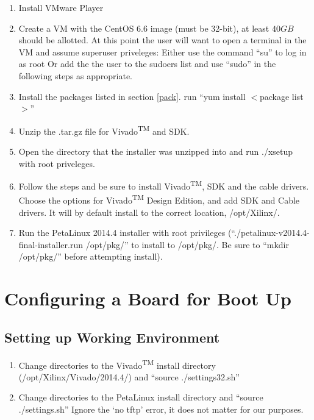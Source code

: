 \begin{enumerate}
\item Install VMware Player
\item Create a VM with the CentOS 6.6 image (must be 32-bit), at least $40GB$ should be allotted.
\subitem At this point the user will want to open a terminal in the VM and assume superuser priveleges:
\subsubitem Either use the command ``su'' to log in as root
\subsubitem Or add the the user to the sudoers list and use ``sudo'' in the following steps as appropriate.
\item Install the packages listed in section \ref{pack}.
\subitem run ``yum install $<$package list$>$''
\item Unzip the .tar.gz file for Vivado\textsuperscript{TM} and SDK.
\item Open the directory that the installer was unzipped into and run ./xsetup with root priveleges.
\item Follow the steps and be sure to install Vivado\textsuperscript{TM}, SDK and the cable drivers. Choose the options for Vivado\textsuperscript{TM} Design Edition, and add SDK and Cable drivers. It will by default install to the correct location, /opt/Xilinx/.
\item\nohyphens{ Run the PetaLinux 2014.4 installer with root privileges (``./petalinux-v2014.4-final-installer.run /opt/pkg/'' to install to /opt/pkg/. Be sure to ``mkdir /opt/pkg/'' before attempting install).}
\end{enumerate}
\section{Configuring a Board for Boot Up}
\subsection{Setting up Working Environment}
\begin{enumerate}
\item Change directories to the Vivado\textsuperscript{TM} install directory (/opt/Xilinx/Vivado/2014.4/) and ``source ./settings32.sh''
\item Change directories to the PetaLinux install directory and ``source ./settings.sh''
\subitem Ignore the `no tftp' error, it does not matter for our purposes.
\end{enumerate}
